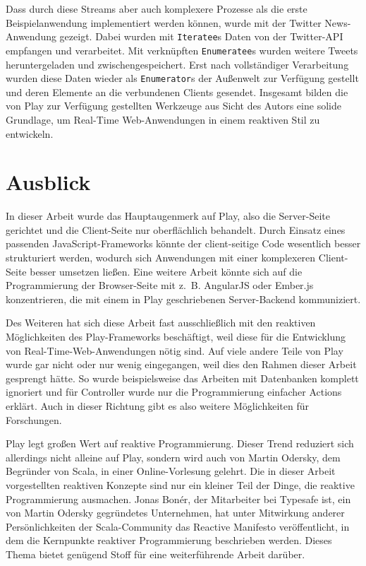 Dass durch diese Streams aber auch komplexere Prozesse als die erste Beispielanwendung implementiert werden können, wurde mit der Twitter News-Anwendung gezeigt.
Dabei wurden mit \lstinline|Iteratee|s Daten von der Twitter-API empfangen und verarbeitet.
Mit verknüpften \lstinline|Enumeratee|s wurden weitere Tweets heruntergeladen und zwischengespeichert.
Erst nach vollständiger Verarbeitung wurden diese Daten wieder als \lstinline|Enumerator|s der Außenwelt zur Verfügung gestellt und deren Elemente an die verbundenen Clients gesendet.
Insgesamt bilden die von Play zur Verfügung gestellten Werkzeuge aus Sicht des Autors eine solide Grundlage, um Real-Time Web-Anwendungen in einem reaktiven Stil zu entwickeln.


\section{Ausblick} %
\label{sec:ausblick}

In dieser Arbeit wurde das Hauptaugenmerk auf Play, also die Server-Seite gerichtet und die Client-Seite nur oberflächlich behandelt.
Durch Einsatz eines passenden JavaScript-Frameworks könnte der client-seitige Code wesentlich besser strukturiert werden, wodurch sich Anwendungen mit einer komplexeren Client-Seite besser umsetzen ließen.
Eine weitere Arbeit könnte sich auf die Programmierung der Browser-Seite mit z.~B. AngularJS \cite[vgl.][]{angular_js} oder \mbox{Ember.js} \cite[vgl.][]{ember_js} konzentrieren, die mit einem in Play geschriebenen Server-Backend kommuniziert. %

Des Weiteren hat sich diese Arbeit fast ausschließlich mit den reaktiven Möglichkeiten des Play-Frameworks beschäftigt, weil diese für die Entwicklung von Real-Time-Web-Anwendungen nötig sind.
Auf viele andere Teile von Play wurde gar nicht oder nur wenig eingegangen, weil dies den Rahmen dieser Arbeit gesprengt hätte.
So wurde beispielsweise das Arbeiten mit Datenbanken komplett ignoriert und für Controller wurde nur die Programmierung einfacher Actions erklärt.
Auch in dieser Richtung gibt es also weitere Möglichkeiten für Forschungen.

Play legt großen Wert auf reaktive Programmierung.
Dieser Trend reduziert sich allerdings nicht alleine auf Play, sondern wird auch von Martin Odersky, dem Begründer von Scala, in einer Online-Vorlesung \cite[vgl.][]{principles_of_reactive_programming} gelehrt.
Die in dieser Arbeit vorgestellten reaktiven Konzepte sind nur ein kleiner Teil der Dinge, die reaktive Programmierung ausmachen.
Jonas Bonér, der Mitarbeiter bei Typesafe ist, ein von Martin Odersky gegründetes Unternehmen, hat unter Mitwirkung anderer Persönlichkeiten der Scala-Community das Reactive Manifesto \cite[vgl.][]{reactive_manifesto} veröffentlicht, in dem die Kernpunkte reaktiver Programmierung beschrieben werden.
Dieses Thema bietet genügend Stoff für eine weiterführende Arbeit darüber.


